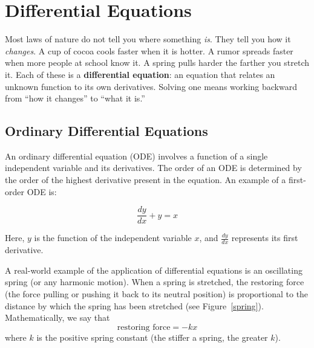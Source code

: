 \chapter{Differential Equations}

Most laws of nature do not tell you where something \emph{is}. They tell
you how it \emph{changes}. A cup of cocoa cools faster when it is hotter. A
rumor spreads faster when more people at school know it. A spring pulls
harder the farther you stretch it. Each of these is a
\textbf{differential equation}: an equation that relates an unknown
function to its own derivatives. Solving one means working backward from
``how it changes'' to ``what it is.'' 

\section{Ordinary Differential Equations}

An ordinary differential equation (ODE) involves a function of a
single independent variable and its derivatives. The order of an ODE
is determined by the order of the highest derivative present in the
equation. An example of a first-order ODE is: 

\begin{equation}
\frac{dy}{dx} + y = x
\end{equation}

Here, $y$ is the function of the independent variable $x$, and 
$\frac{dy}{dx}$ represents its first derivative.

A real-world example of the application of differential equations is an 
oscillating spring (or any harmonic motion). When a spring is stretched, the 
restoring force (the force pulling or pushing it back to its neutral position) 
is proportional to the distance by which the spring has been stretched (see 
Figure~\ref{spring}). Mathematically, we say that
$$\text{restoring force} = -kx$$
where $k$ is the positive spring constant (the stiffer a spring, the greater 
$k$). 

